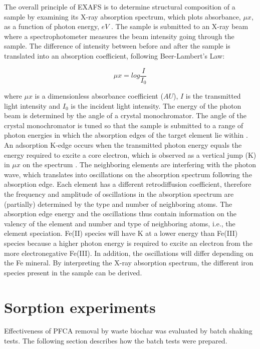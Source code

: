 The overall principle of EXAFS is to determine structural composition of a sample by examining its X-ray absorption spectrum, which plots absorbance, $\mu x$, as a function of photon energy, $eV$ \citep{vlaica2004exafs}. The sample is submitted to an X-ray beam where a spectrophotometer measures the beam intensity going through the sample. The difference of intensity between before and after the sample is translated into an absorption coefficient, following Beer-Lambert's Law: 

\begin{equation}\label{eq:absorbance}
    \mu x = log \frac{I}{I_0}
\end{equation}

where $\mu x$ is a dimensionless absorbance coefficient ($AU$), $I$ is the transmitted light intensity and $I_0$ is the incident light intensity. The energy of the photon beam is determined by the angle of a crystal monochromator. The angle of the crystal monochromator is tuned so that the sample is submitted to a range of photon energies in which the absorption edges of the target element lie within \citep{vlaica2004exafs}. An adsorption K-edge occurs when the transmitted photon energy equals the energy required to excite a core electron, which is observed as a vertical jump (K) in $\mu x$ on the spectrum \citep{vlaica2004exafs}. The neighboring elements are interfering with the photon wave, which translates into oscillations on the absorption spectrum following the absorption edge. Each element has a different retrodiffusion coefficient, therefore the frequency and amplitude of oscillations in the absorption spectrum are (partially) determined by the type and number of neighboring atoms. The absorption edge energy and the oscillations thus contain information on the valency of the element and number and type of neighboring atoms, i.e., the element speciation. Fe(II) species will have K at a lower energy than Fe(III) species because a higher photon energy is required to excite an electron from the more electronegative Fe(III). In addition, the oscillations will differ depending on the Fe mineral. By interpreting the X-ray absorption spectrum, the different iron species present in the sample can be derived.


\section{Sorption experiments}
Effectiveness of PFCA removal by waste biochar was evaluated by batch shaking tests. The following section describes how the batch tests were prepared.

